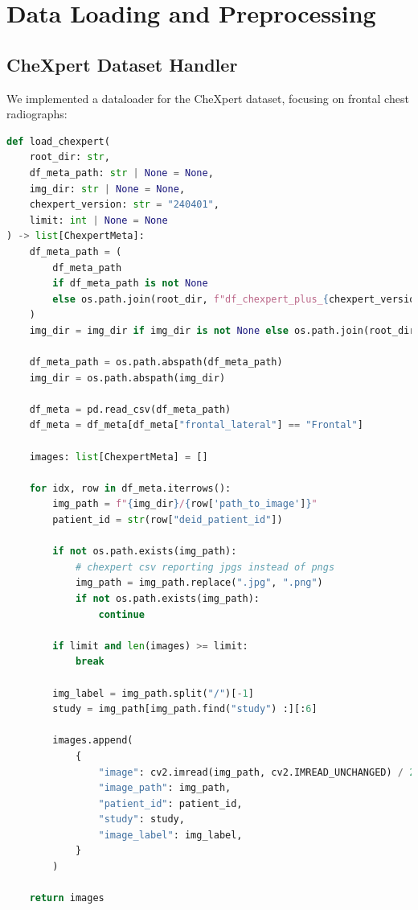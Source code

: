 \documentclass[nomenclature, english, bibtex]{kththesis}
\numberwithin{listing}{chapter}
\begin{document}
\section{Data Loading and Preprocessing}
\subsection{CheXpert Dataset Handler}
We implemented a dataloader for the CheXpert dataset, focusing on frontal chest radiographs:

\begin{lstlisting}[language=Python, caption=CheXpert dataset loader implementation]
def load_chexpert(
    root_dir: str,
    df_meta_path: str | None = None,
    img_dir: str | None = None,
    chexpert_version: str = "240401",
    limit: int | None = None
) -> list[ChexpertMeta]:
    df_meta_path = (
        df_meta_path
        if df_meta_path is not None
        else os.path.join(root_dir, f"df_chexpert_plus_{chexpert_version}.csv")
    )
    img_dir = img_dir if img_dir is not None else os.path.join(root_dir, "PNG")

    df_meta_path = os.path.abspath(df_meta_path)
    img_dir = os.path.abspath(img_dir)

    df_meta = pd.read_csv(df_meta_path)
    df_meta = df_meta[df_meta["frontal_lateral"] == "Frontal"]

    images: list[ChexpertMeta] = []

    for idx, row in df_meta.iterrows():
        img_path = f"{img_dir}/{row['path_to_image']}"
        patient_id = str(row["deid_patient_id"])

        if not os.path.exists(img_path):
            # chexpert csv reporting jpgs instead of pngs
            img_path = img_path.replace(".jpg", ".png")
            if not os.path.exists(img_path):
                continue

        if limit and len(images) >= limit:
            break

        img_label = img_path.split("/")[-1]
        study = img_path[img_path.find("study") :][:6]

        images.append(
            {
                "image": cv2.imread(img_path, cv2.IMREAD_UNCHANGED) / 255.0,
                "image_path": img_path,
                "patient_id": patient_id,
                "study": study,
                "image_label": img_label,
            }
        )

    return images
\end{lstlisting}
\end{document}
